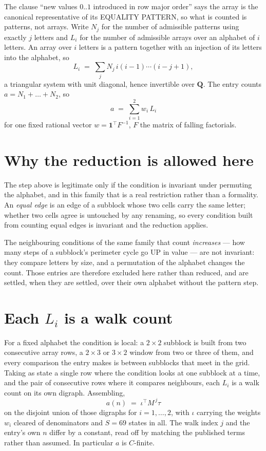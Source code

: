 \documentclass[11pt,a4paper]{article}
\theoremstyle{plain}
\theoremstyle{definition}
\begin{document}
The clause ``new values $0..1$ introduced in row major order'' says the array is the
canonical representative of its EQUALITY PATTERN, so what is counted is patterns, not arrays.
Write $N_j$ for the number of admissible patterns using exactly $j$ letters and $L_i$ for the
number of admissible arrays over an alphabet of $i$ letters. An array over $i$ letters is a
pattern together with an injection of its letters into the alphabet, so
\[
L_i\;=\;\sum_j N_j\,i(i-1)\cdots(i-j+1),
\]
a triangular system with unit diagonal, hence invertible over $\mathbf{Q}$. The entry counts
$a=N_1+\dots+N_{2}$, so
\[
a\;=\;\sum_{i=1}^{2}w_i\,L_i
\]
for one fixed rational vector $w=\mathbf{1}^{\!\top}F^{-1}$, $F$ the matrix of falling
factorials.

\section{Why the reduction is allowed here}

The step above is legitimate only if the condition is invariant under permuting the alphabet,
and in this family that is a real restriction rather than a formality. An \emph{equal edge}
is an edge of a subblock whose two cells carry the same letter; whether two cells agree is
untouched by any renaming, so every condition built from counting equal edges is invariant and
the reduction applies.

The neighbouring conditions of the same family that count \emph{increases} --- how many steps
of a subblock's perimeter cycle go UP in value --- are not invariant: they compare letters by
size, and a permutation of the alphabet changes the count. Those entries are therefore excluded
here rather than reduced, and are settled, when they are settled, over their own alphabet
without the pattern step.

\section{Each $L_i$ is a walk count}

For a fixed alphabet the condition is local: a $2\times2$ subblock is built from two
consecutive array rows, a $2\times3$ or $3\times2$ window from two or three of them, and every
comparison the entry makes is between subblocks that meet in the grid. Taking as state a single
row where the condition looks at one subblock at a time, and the pair of consecutive rows where
it compares neighbours, each $L_i$ is a walk count on its own digraph. Assembling,
\[
a(n)\;=\;\iota^{\!\top}M^{\,j}\tau
\]
on the disjoint union of those digraphs for $i=1,\dots,2$, with $\iota$ carrying the weights
$w_i$ cleared of denominators and $S=69$ states in all. The walk index $j$ and the entry's own
$n$ differ by a constant, read off by matching the published terms rather than assumed. In
particular $a$ is $C$-finite.
\end{document}
